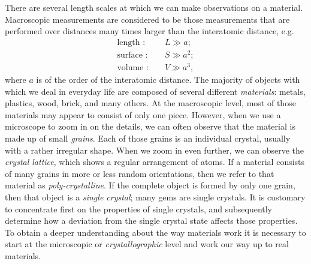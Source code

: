 There are several length scales at which we can make observations on a material.  Macroscopic measurements are considered to be those measurements that are performed over distances many times larger than the interatomic distance, e.g.\
\begin{eqnarray}
	\mbox{length : }&&L \gg a; \nonumber\\
	\mbox{surface : }&&S \gg a^{2};\\
	\mbox{volume : }&&V \gg a^{3},\nonumber
\end{eqnarray}
where $a$ is of the order of the interatomic distance.  The majority of objects with which we deal in everyday life are composed of several different \textit{materials}: metals, plastics, wood, brick, and many others.  At the macroscopic level, most of those materials may appear to consist of only one piece.  However, when we use a microscope to zoom in on the details, we can often observe that the material is made up of small \textit{grains}.  Each of those grains is an individual crystal, usually with a rather irregular shape.  When we zoom in even further, we can observe the \textit{crystal lattice}, which shows a regular arrangement of atoms.  If a material consists of many grains in more or less random orientations, then we refer to that material as \textit{poly-crystalline}.  If the complete object is formed by only one grain, then that object is a \textit{single crystal}; many gems are single crystals.  It is customary to concentrate first on the properties of single crystals, and subsequently determine how a deviation from the single crystal state affects those properties.  To obtain a deeper understanding about the way materials work it is necessary to start at the microscopic or \textit{crystallographic} level and work our way up to real materials.

